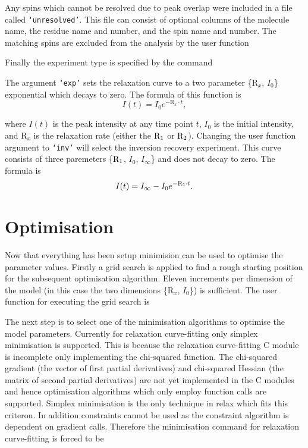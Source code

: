 Any spins which cannot be resolved due to peak overlap were included in a file called \texttt{`unresolved'}.  This file can consist of optional columns of the molecule name, the residue name and number, and the spin name and number.  The matching spins are excluded from the analysis by the user function


Finally the experiment type is specified by the command


The argument \texttt{`exp'} sets the relaxation curve to a two parameter \{$\mathrm{R}_x$, $I_0$\} exponential which decays to zero.  The formula of this function is
\begin{equation}
 I(t) = I_0 e^{-\mathrm{R}_x \cdot t},
\end{equation}

\noindent where $I(t)$ is the peak intensity at any time point $t$, $I_0$ is the initial intensity, and $\mathrm{R}_x$ is the relaxation rate (either the $\mathrm{R}_1$ or $\mathrm{R}_2$).  Changing the user function argument to \texttt{`inv'} will select the inversion recovery experiment.  This curve consists of three paremeters \{$\mathrm{R}_1$, $I_0$, $I_{\infty}$\} and does not decay to zero.  The formula is
\begin{equation}
 I(t) = I_{\infty} - I_0 e^{-\mathrm{R}_1 \cdot t}.
\end{equation}




\section{Optimisation}

Now that everything has been setup minimision can be used to optimise the parameter values.  Firstly a grid search is applied to find a rough starting position for the subsequent optimisation algorithm.  Eleven increments per dimension of the model (in this case the two dimensions \{$\mathrm{R}_x$, $I_0$\}) is sufficient.  The user function for executing the grid search is


The next step is to select one of the minimisation algorithms to optimise the model parameters.  Currently for relaxation curve-fitting only simplex minimisation is supported.  This is because the relaxation curve-fitting C module is incomplete only implementing the chi-squared function.  The chi-squared gradient (the vector of first partial derivatives) and chi-squared Hessian (the matrix of second partial derivatives) are not yet implemented in the C modules and hence optimisation algorithms which only employ function calls are supported.  Simplex minimisation is the only technique in relax which fits this criteron.  In addition constraints cannot be used as the constraint algorithm is dependent on gradient calls.  Therefore the minimisation command for relaxation curve-fitting is forced to be

